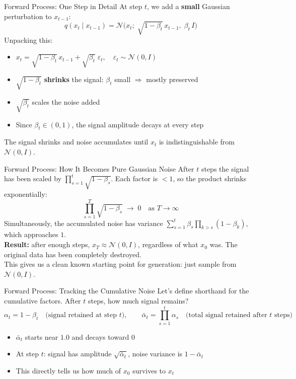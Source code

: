 \documentclass[10pt, aspectratio=169]{beamer}
\begin{document}
\begin{frame}{Forward Process: One Step in Detail}
  At step $t$, we add a \textbf{small} Gaussian perturbation to $x_{t-1}$:
  \[
    q(x_t \mid x_{t-1}) = \mathcal{N}\!\bigl(x_t;\;\sqrt{1-\beta_t}\,x_{t-1},\;\beta_t\,I\bigr)
  \]
  Unpacking this:
  \begin{itemize}
    \item $x_t = \sqrt{1-\beta_t}\,x_{t-1} + \sqrt{\beta_t}\;\varepsilon_t, \quad \varepsilon_t \sim \mathcal{N}(0,I)$
    \item $\sqrt{1-\beta_t}$ \textbf{shrinks} the signal: $\beta_t$ small $\Rightarrow$ mostly preserved
    \item $\sqrt{\beta_t}$ scales the noise added
    \item Since $\beta_t \in (0,1)$, the signal amplitude decays at every step
  \end{itemize}
  \vspace{6pt}
  The signal shrinks and noise accumulates until $x_t$ is indistinguishable from $\mathcal{N}(0,I)$.
\end{frame}

\begin{frame}{Forward Process: How It Becomes Pure Gaussian Noise}
  After $t$ steps the signal has been scaled by $\prod_{s=1}^t \sqrt{1-\beta_s}$.
  Each factor is $< 1$, so the product shrinks exponentially:
  \[
    \prod_{s=1}^{T}\sqrt{1-\beta_s} \;\to\; 0 \quad \text{as } T \to \infty
  \]
  Simultaneously, the accumulated noise has variance $\sum_{s=1}^t \beta_s \prod_{k>s}(1-\beta_k)$,
  which approaches $1$.\\[8pt]
  \textbf{Result:} after enough steps, $x_T \approx \mathcal{N}(0,I)$, regardless of what $x_0$ was.
  The original data has been completely destroyed.\\[6pt]
  This gives us a clean known starting point for generation: just sample from $\mathcal{N}(0,I)$.
\end{frame}

\begin{frame}{Forward Process: Tracking the Cumulative Noise}
  Let's define shorthand for the cumulative factors.
  After $t$ steps, how much signal remains?
  \[
    \alpha_t = 1 - \beta_t \quad\text{(signal retained at step }t\text{)},\qquad
    \bar\alpha_t = \prod_{s=1}^{t}\alpha_s \quad\text{(total signal retained after }t\text{ steps)}
  \]
  \begin{itemize}
    \item $\bar\alpha_t$ starts near $1.0$ and decays toward $0$
    \item At step $t$: signal has amplitude $\sqrt{\bar\alpha_t}$, noise variance is $1 - \bar\alpha_t$
    \item This directly tells us how much of $x_0$ survives to $x_t$
  \end{itemize}
\end{frame}
\end{document}
